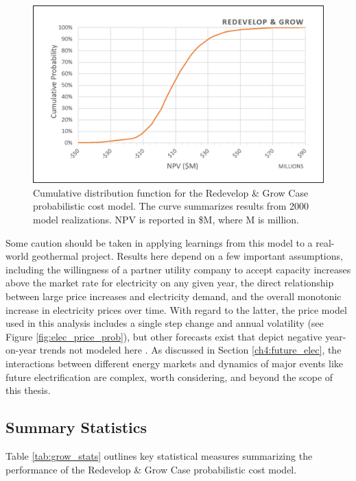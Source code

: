 \begin{figure}[!htp]
\centering
\includegraphics[width=.85\textwidth]{templates/images/Figure-Grow_Case_CDF.png}
\caption[Redevelop \& Grow Case CDF]{Cumulative distribution function for the Redevelop \& Grow Case probabilistic cost model. The curve summarizes results from 2000 model realizations. NPV is reported in \$M, where M is million.}
\label{fig:grow_case_cdf}
\end{figure}

Some caution should be taken in applying learnings from this model to a real-world geothermal project. Results here depend on a few important assumptions, including the willingness of a partner utility company to accept capacity increases above the market rate for electricity on any given year, the direct relationship between large price increases and electricity demand, and the overall monotonic increase in electricity prices over time. With regard to the latter, the price model used in this analysis includes a single step change and annual volatility (see Figure \ref{fig:elec_price_prob}), but other forecasts exist that depict negative year-on-year trends not modeled here \citep{murphy_electrification_2021}. As discussed in Section \ref{ch4:future_elec}, the interactions between different energy markets and dynamics of major events like future electrification are complex, worth considering, and beyond the scope of this thesis. 

\subsection{Summary Statistics}
\label{ch6:grow_stats}

Table \ref{tab:grow_stats} outlines key statistical measures summarizing the performance of the Redevelop \& Grow Case probabilistic cost model.

